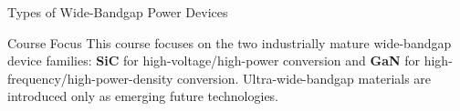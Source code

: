 \begin{frame}{Types of Wide-Bandgap Power Devices}

\vspace{0.25cm}

\begin{block}{Course Focus}
\small
This course focuses on the two industrially mature wide-bandgap device families:
\textbf{SiC} for high-voltage/high-power conversion and \textbf{GaN} for high-frequency/high-power-density conversion.
Ultra-wide-bandgap materials are introduced only as emerging future technologies.
\end{block}

\end{frame}



